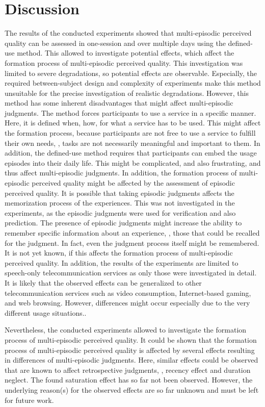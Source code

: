 \section{Discussion}
The results of the conducted experiments showed that multi-episodic perceived quality can be assessed in one-session and over multiple days using the defined-use method.
This allowed to investigate potential effects, which affect the formation process of multi-episodic perceived quality.
This investigation was limited to severe degradations, so potential effects are observable.
Especially, the required between-subject design and complexity of experiments make this method unsuitable for the precise investigation of realistic degradations.
However, this method has some inherent disadvantages that might affect multi-episodic judgments.
The method forces participants to use a service in a specific manner.
Here, it is defined when, how, for what a service has to be used.
This might affect the formation process, because participants are not free to use a service to fulfill their own needs, \ie, tasks are not necessarily meaningful and important to them.
In addition, the defined-use method requires that participants can embed the usage episodes into their daily life.
This might be complicated, and also frustrating, and thus affect multi-episodic judgments.
In addition, the formation process of multi-episodic perceived quality might be affected by the assessment of episodic perceived quality.
It is possible that taking episodic judgments affects the memorization process of the experiences.
This was not investigated in the experiments, as the episodic judgments were used for verification and also prediction.
The presence of episodic judgments might increase the ability to remember specific information about an experience, \ie, those that could be recalled for the judgment.
In fact, even the judgment process itself might be remembered.
It is not yet known, if this affects the formation process of multi-episodic perceived quality.
In addition, the results of the experiments are limited to speech-only telecommunication services as only those were investigated in detail.
It is likely that the observed effects can be generalized to other telecommunication services such as video consumption, Internet-based gaming, and web browsing.
However, differences might occur especially due to the very different usage situations..

Nevertheless, the conducted experiments allowed to investigate the formation process of multi-episodic perceived quality.
It could be shown that the formation process of multi-episodic perceived quality is affected by several effects resulting in differences of multi-episodic judgments.
Here, similar effects could be observed that are known to affect retrospective judgments, \ie, recency effect and duration neglect.
The found saturation effect has so far not been observed.
However, the underlying reason(s) for the observed effects are so far unknown and must be left for future work.

